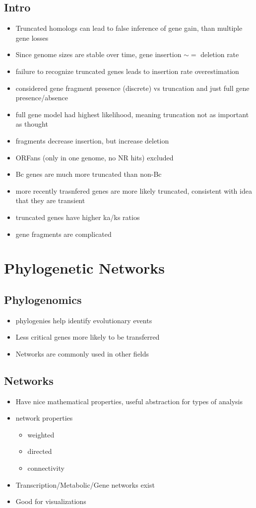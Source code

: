 \documentclass[10pt,letter]{article}
\begin{document}
\subsection*{Intro}
\begin{itemize}
    \item Truncated homologs can lead to false inference of gene gain, than multiple gene losses
    \item Since genome sizes are stable over time, gene insertion $\sim=$ deletion rate
    \item failure to recognize truncated genes leads to insertion rate overestimation
    \item considered gene fragment presence (discrete) vs truncation and just full gene presence/absence
    \item full gene model had highest likelihood, meaning truncation not as important as thought
    \item fragments decrease insertion, but increase deletion
    \item ORFans (only in one genome, no NR hits) excluded
    \item Bc genes are much more truncated than non-Bc
    \item more recently trasnfered genes are more likely truncated, consistent with idea that they are transient
    \item truncated genes have higher ka/ks ratios
    \item gene fragments are complicated
\end{itemize}
\section*{Phylogenetic Networks\cite{phynet}}
\subsection*{Phylogenomics}
\begin{itemize}
    \item phylogenies help identify evolutionary events
    \item Less critical genes more likely to be transferred
    \item Networks are commonly used in other fields
\end{itemize}
\subsection*{Networks}
\begin{itemize}
    \item Have nice mathematical properties, useful abstraction for types of analysis
    \item network properties
    \begin{itemize}
        \item weighted
        \item directed
        \item connectivity
    \end{itemize}
    \item Transcription/Metabolic/Gene networks exist
    \item Good for visualizations
\end{itemize}
\end{document}
